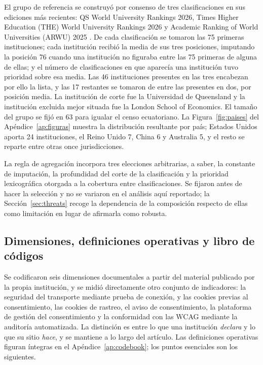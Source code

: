 \documentclass[pdflatex,sn-basic,Numbered,iicol]{sn-jnl}
\theoremstyle{thmstyleone}
\theoremstyle{thmstyletwo}
\theoremstyle{thmstylethree}
\begin{document}
El grupo de referencia se construy\'o por consenso de tres clasificaciones en sus ediciones m\'as recientes: QS World University Rankings 2026, Times Higher Education (THE) World University Rankings 2026 y Academic Ranking of World Universities (ARWU) 2025 \citep{qs2026,the2026,arwu2025}. De cada clasificaci\'on se tomaron las 75 primeras instituciones; cada instituci\'on recibi\'o la media de sus tres posiciones, imputando la posici\'on 76 cuando una instituci\'on no figuraba entre las 75 primeras de alguna de ellas; y el n\'umero de clasificaciones en que aparec\'ia una instituci\'on tuvo prioridad sobre esa media. Las 46 instituciones presentes en las tres encabezan por ello la lista, y las 17 restantes se tomaron de entre las presentes en dos, por posici\'on media. La instituci\'on de corte fue la Universidad de Queensland y la instituci\'on excluida mejor situada fue la London School of Economics. El tama\~no del grupo se fij\'o en 63 para igualar el censo ecuatoriano. La Figura~\ref{fig:paises} del Ap\'endice~\ref{ap:figuras} muestra la distribuci\'on resultante por pa\'is; Estados Unidos aporta 24 instituciones, el Reino Unido 7, China 6 y Australia 5, y el resto se reparte entre otras once jurisdicciones.

La regla de agregaci\'on incorpora tres elecciones arbitrarias, a saber, la constante de imputaci\'on, la profundidad del corte de la clasificaci\'on y la prioridad lexicogr\'afica otorgada a la cobertura entre clasificaciones. Se fijaron antes de hacer la selecci\'on y no se variaron en el an\'alisis aqu\'i reportado; la Secci\'on~\ref{sec:threats} recoge la dependencia de la composici\'on respecto de ellas como limitaci\'on en lugar de afirmarla como robusta.

\subsection{Dimensiones, definiciones operativas y libro de c\'odigos}\label{sec:methods-codebook}

Se codificaron seis dimensiones documentales a partir del material publicado por la propia instituci\'on, y se midi\'o directamente otro conjunto de indicadores: la seguridad del transporte mediante prueba de conexi\'on, y las cookies previas al consentimiento, las cookies de rastreo, el aviso de consentimiento, la plataforma de gesti\'on del consentimiento y la conformidad con las WCAG mediante la auditor\'ia automatizada. La distinci\'on es entre lo que una instituci\'on \emph{declara} y lo que su sitio \emph{hace}, y se mantiene a lo largo del art\'iculo. Las definiciones operativas figuran \'integras en el Ap\'endice~\ref{ap:codebook}; los puntos esenciales son los siguientes.
\end{document}
